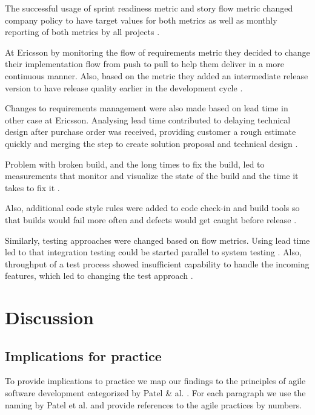 \documentclass{sig-alternate}
\begin{document}
The successful usage of sprint readiness metric and story flow metric changed
company policy to have target values for both metrics as well as monthly
reporting of both metrics by all projects \cite{Jakobsen2011168}.

At Ericsson by monitoring the flow of requirements metric they decided to
change their implementation flow from push to pull to help them deliver in a
more continuous manner. Also, based on the metric they added an intermediate
release version to have release quality earlier in the development cycle
\cite{Petersen20101275}.

Changes to requirements management were also made based on lead time in other
case at Ericsson. Analysing lead time contributed to delaying technical design
after purchase order was received, providing customer a rough estimate quickly
and merging the step to create solution proposal and technical design
\cite{Mujtaba2010139}.

Problem with broken build, and the long times to fix the build, led to
measurements that monitor and visualize the state of the build and the time it
takes to fix it \cite{LNBIP01490121,Jakobsen2011168,Janus20129}.

Also, additional code style rules were added to code check-in and build tools
so that builds would fail more often and defects would get caught before
release \cite{Jakobsen2011168,Janus20129}. 

Similarly, testing approaches were changed based on flow metrics. Using lead
time led to that integration testing could be started parallel to system
testing \cite{Mujtaba2010139}. Also, throughput of a test process showed
insufficient capability to handle the incoming features, which led to changing
the test approach \cite{Staron20113}.

\section{Discussion}
\label{sec:Discussion}

\subsection{Implications for practice}
To provide implications to practice we map our findings to the principles of
agile software development \cite{beck2001agile} categorized by Patel \& al.
\cite{1579312}. For each paragraph we use the naming by Patel et al. and
provide references to the agile practices by numbers.
\end{document}
